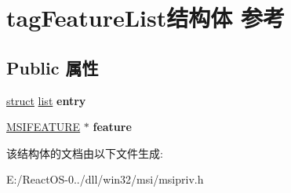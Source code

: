 \hypertarget{structtag_feature_list}{}\section{tag\+Feature\+List结构体 参考}
\label{structtag_feature_list}
\subsection*{Public 属性}
\begin{DoxyCompactItemize}
\item 
\mbox{\label{structtag_feature_list_a4d09c7cd106480ef0c45706b48412d06}} 
\hyperlink{interfacestruct}{struct} \hyperlink{classlist}{list} {\bfseries entry}
\item 
\mbox{\label{structtag_feature_list_a4c2f9c3f75cbb9fe15b9fc1e7c3fe6e3}} 
\hyperlink{structtag_m_s_i_f_e_a_t_u_r_e}{M\+S\+I\+F\+E\+A\+T\+U\+RE} $\ast$ {\bfseries feature}
\end{DoxyCompactItemize}


该结构体的文档由以下文件生成\+:\begin{DoxyCompactItemize}
\item 
E\+:/\+React\+O\+S-\/0../dll/win32/msi/msipriv.\+h\end{DoxyCompactItemize}
